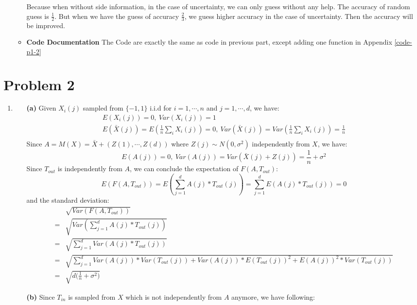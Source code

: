 \documentclass[11pt]{article}
\begin{document}
\begin{enumerate}
\begin{itemize}
	Because when without side information, in the case of uncertainty, we can only guess without any help. The accuracy of random guess is $\frac{1}{2}$. But when we have the guess of accuracy $\frac{2}{3}$, we guess higher accuracy in the case of uncertainty. Then the accuracy will be improved.
	\item \textbf{Code Documentation}
	The Code are exactly the same as code in previous part, except adding one function in Appendix \ref{code-p1-2}
\end{itemize}
\end{enumerate}

\section{Problem 2}
\begin{enumerate}
\item
\begin{enumerate}
	\item[\textbf{(a)}]
	Given $X_i(j)$ sampled from $\{-1, 1\}$ i.i.d for $i = 1, \cdots, n$ and $j = 1, \cdots, d$, we have:
	\[
	\begin{array}{c}
	E(X_i(j)) = 0, ~ Var(X_i(j)) = 1\\
	E(\bar{X}(j)) = E(\frac{1}{n}\sum_i X_i(j)) = 0, 
	~ Var(\bar{X}(j)) = Var(\frac{1}{n}\sum_i X_i(j)) = \frac{1}{n}\\
	\end{array}
	\]
	Since $A = M(X) = \bar{X} + (Z(1), \cdots, Z(d))$ where $Z(j) \sim N(0, \sigma^2)$ independently from $X$, we have:
	\[
	E(A(j)) = 0, ~ Var(A(j)) = Var(\bar{X}(j) + Z(j)) = \frac{1}{n} + \sigma^2
	\]
	Since $T_{out}$ is independently from $A$, we can conclude the expectation of $F(A, T_{out})$:
	\[
	E(F(A, T_{out})) = E(\sum_{j = 1}^{d}A(j) * T_{out}(j))
	= \sum_{j = 1}^{d} E(A(j) * T_{out}(j))
	= 0
	\]
	and the standard deviation:
	\[
	\begin{array}{rl}
	& \sqrt{Var(F(A, T_{out}))}\\
	= & \sqrt{Var(\sum_{j = 1}^{d}A(j) * T_{out}(j))}\\
	= & \sqrt{\sum_{j = 1}^{d}Var(A(j) * T_{out}(j))}\\
	= & \sqrt{ \sum_{j = 1}^{d}Var(A(j)) * Var(T_{out}(j))
	+ Var(A(j))*E(T_{out}(j))^2 + E(A(j))^2 * Var(T_{out}(j))}\\
	= & \sqrt{d \big(\frac{1}{n} + \sigma^2\big)}
	\end{array}
	\]
	\item[\textbf{(b)}]
	Since $T_{in}$ is sampled from $X$ which is not independently from $A$ anymore, we have following:

\end{enumerate}
\end{enumerate}
\end{document}
